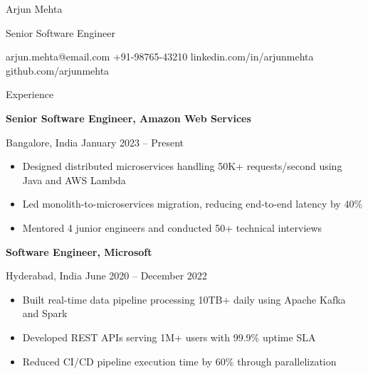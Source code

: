 \documentclass[11pt,a4paper]{article}
\begin{document}
{\fontsize{28pt}{32pt}\selectfont Arjun Mehta}\par
\vspace{6pt}
{\fontsize{11pt}{13pt}\selectfont Senior Software Engineer}\par
\vspace{4pt}
{\fontsize{9pt}{11pt}\selectfont arjun.mehta@email.com \quad +91-98765-43210 \quad linkedin.com/in/arjunmehta \quad github.com/arjunmehta}\par
\vspace{16pt}

{\fontsize{14pt}{17pt}\selectfont Experience}\par
\vspace{8pt}

{\fontsize{11pt}{13pt}\selectfont\bfseries Senior Software Engineer, Amazon Web Services}\par
{\fontsize{9pt}{11pt}\selectfont Bangalore, India \quad January 2023 -- Present}\par
\vspace{4pt}
\begin{itemize}[leftmargin=1.2em, itemsep=1pt, topsep=0pt, label={\textbullet}]
\item \small Designed distributed microservices handling 50K+ requests/second using Java and AWS Lambda
\item \small Led monolith-to-microservices migration, reducing end-to-end latency by 40\%
\item \small Mentored 4 junior engineers and conducted 50+ technical interviews
\end{itemize}
\vspace{10pt}

{\fontsize{11pt}{13pt}\selectfont\bfseries Software Engineer, Microsoft}\par
{\fontsize{9pt}{11pt}\selectfont Hyderabad, India \quad June 2020 -- December 2022}\par
\vspace{4pt}
\begin{itemize}[leftmargin=1.2em, itemsep=1pt, topsep=0pt, label={\textbullet}]
\item \small Built real-time data pipeline processing 10TB+ daily using Apache Kafka and Spark
\item \small Developed REST APIs serving 1M+ users with 99.9\% uptime SLA
\item \small Reduced CI/CD pipeline execution time by 60\% through parallelization
\end{itemize}
\vspace{16pt}
\end{document}
